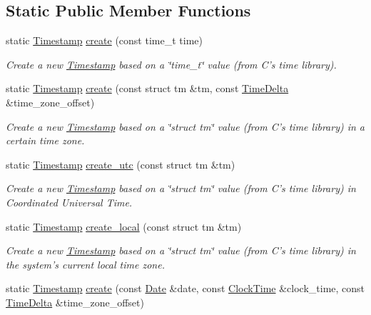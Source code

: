 \subsection*{Static Public Member Functions}
\begin{DoxyCompactItemize}
\item 
static \hyperlink{structTimestamp}{Timestamp} \hyperlink{structTimestamp_af811b2a56455db514336c0eeeb061ae0}{create} (const time\-\_\-t time)
\begin{DoxyCompactList}\small\item\em Create a new \hyperlink{structTimestamp}{Timestamp} based on a \char`\"{}time\-\_\-t\char`\"{} value (from C's time library). \end{DoxyCompactList}\item 
static \hyperlink{structTimestamp}{Timestamp} \hyperlink{structTimestamp_a33f19b24e53fb06f9ea0285f7ed495aa}{create} (const struct tm \&tm, const \hyperlink{structTimeDelta}{Time\-Delta} \&time\-\_\-zone\-\_\-offset)
\begin{DoxyCompactList}\small\item\em Create a new \hyperlink{structTimestamp}{Timestamp} based on a \char`\"{}struct tm\char`\"{} value (from C's time library) in a certain time zone. \end{DoxyCompactList}\item 
static \hyperlink{structTimestamp}{Timestamp} \hyperlink{structTimestamp_ae1ec817a76d5f43941548b9cccf3bdeb}{create\-\_\-utc} (const struct tm \&tm)
\begin{DoxyCompactList}\small\item\em Create a new \hyperlink{structTimestamp}{Timestamp} based on a \char`\"{}struct tm\char`\"{} value (from C's time library) in Coordinated Universal Time. \end{DoxyCompactList}\item 
static \hyperlink{structTimestamp}{Timestamp} \hyperlink{structTimestamp_ae2d7fea77bd2f2c7ca3343be080dd90f}{create\-\_\-local} (const struct tm \&tm)
\begin{DoxyCompactList}\small\item\em Create a new \hyperlink{structTimestamp}{Timestamp} based on a \char`\"{}struct tm\char`\"{} value (from C's time library) in the system's current local time zone. \end{DoxyCompactList}\item 
static \hyperlink{structTimestamp}{Timestamp} \hyperlink{structTimestamp_a007e724059ba1b14d68579e6b4a30d86}{create} (const \hyperlink{structDate}{Date} \&date, const \hyperlink{structClockTime}{Clock\-Time} \&clock\-\_\-time, const \hyperlink{structTimeDelta}{Time\-Delta} \&time\-\_\-zone\-\_\-offset)

\end{DoxyCompactItemize}
